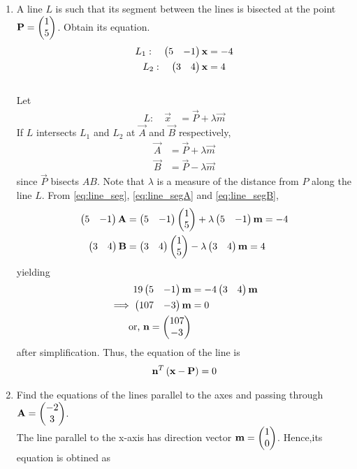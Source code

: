 \documentclass[journal,12pt,twocolumn]{IEEEtran}
\renewcommand\thesection{\arabic{section}}
\begin{document}
\begin{enumerate}[label=\thesection.\arabic*.,ref=\thesection.\theenumi]
%

\item A line $L$ is such that its segment between the lines %
is bisected at the point $\mathbf{P} = \begin{pmatrix}1\\5\end{pmatrix}$.  Obtain its equation.
\begin{align}
\label{eq:line_seg}
L_1: \quad \begin{pmatrix}5 & -1\end{pmatrix}\mathbf{x}  &= -4
\\
L_2: \quad \begin{pmatrix}3 & 4\end{pmatrix}\mathbf{x}  &= 4
\end{align}
%
\\
\solution Let 
%
\begin{align}
L: \quad \vec{x}  &= \vec{P} + \lambda \vec{m}
\end{align}
%
If $L$ intersects $L_1$ and $L_2$ at $\vec{A}$ and $\vec{B}$ respectively, 
%
\begin{align}
\label{eq:line_segA}
 \vec{A}  &= \vec{P} + \lambda \vec{m}
\\
 \vec{B}  &= \vec{P} - \lambda \vec{m}
\label{eq:line_segB}
\end{align}
%
since $\vec{P}$ bisects $AB$. Note that $\lambda$ is a measure of the distance from $P$  along the line $L$.
%
From \eqref{eq:line_seg}, \eqref{eq:line_segA} and \eqref{eq:line_segB},
%
\begin{align}
\begin{pmatrix}5 & -1\end{pmatrix} \mathbf{A}  &= \begin{pmatrix}5 & -1\end{pmatrix}\begin{pmatrix}1\\5\end{pmatrix} + \lambda \begin{pmatrix}5 & -1\end{pmatrix}\mathbf{m}=-4
\\
\begin{pmatrix}3 & 4\end{pmatrix} \mathbf{B}  &= \begin{pmatrix}3 & 4\end{pmatrix}\begin{pmatrix}1\\5\end{pmatrix} - \lambda \begin{pmatrix}3 & 4\end{pmatrix}\mathbf{m}=4
\end{align}
%
yielding
%
\begin{align}
19\begin{pmatrix}5 & -1\end{pmatrix}\mathbf{m}&=-4 \begin{pmatrix}3 & 4\end{pmatrix}\mathbf{m}
\\
\implies \begin{pmatrix}107 & -3\end{pmatrix}\mathbf{m} &= 0
\\
\text{or, } \mathbf{n} = \begin{pmatrix}107\\-3\end{pmatrix}
\end{align}
%
after simplification.
Thus, the equation of the line is 
\begin{align}
\mathbf{n}^T\left(\mathbf{x}-\mathbf{P}\right) =0
\end{align}
\item Find the equations of the lines parallel to the axes and passing through $\mathbf{A}=\begin{pmatrix}-2\\3\end{pmatrix}$.
%
\\
\solution The line parallel to the x-axis has direction vector $\mathbf{m}=\begin{pmatrix}1\\0\end{pmatrix}$.  Hence,its equation is obtined as

\end{enumerate}
\end{document}
